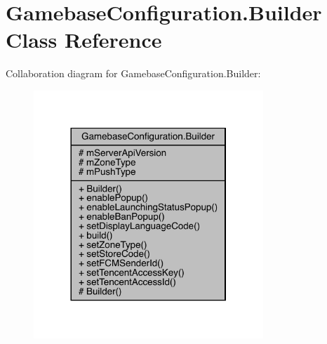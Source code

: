 \hypertarget{classcom_1_1toast_1_1android_1_1gamebase_1_1_gamebase_configuration_1_1_builder}{}\section{Gamebase\+Configuration.\+Builder Class Reference}
\label{classcom_1_1toast_1_1android_1_1gamebase_1_1_gamebase_configuration_1_1_builder}


Collaboration diagram for Gamebase\+Configuration.\+Builder\+:
\nopagebreak
\begin{figure}[H]
\begin{center}
\leavevmode
\includegraphics[width=245pt]{classcom_1_1toast_1_1android_1_1gamebase_1_1_gamebase_configuration_1_1_builder__coll__graph}
\end{center}
\end{figure}
